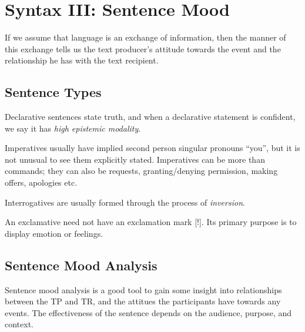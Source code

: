 \documentclass[../main.tex]{subfiles}
\begin{document}
	\section{Syntax III: Sentence Mood}
	\begin{preamb}
		If we assume that language is an exchange of information, then the manner of this exchange tells us the text producer's attitude towards the event and the relationship he has with the text recipient.
	\end{preamb}
	
	\subsection{Sentence Types}
		Declarative sentences state truth, and when a declarative statement is confident, we say it has \textit{high epistemic modality}.

		Imperatives usually have implied second person singular pronouns ``you'', but it is not unusual to see them explicitly stated.
		Imperatives can be more than commands; they can also be requests, granting/denying permission, making offers, apologies etc. 

		Interrogatives are usually formed through the process of \textit{inversion}.

		An exclamative need not have an exclamation mark [!]. Its primary purpose is to display emotion or feelings.

	\subsection{Sentence Mood Analysis}
	Sentence mood analysis is a good tool to gain some insight into relationships between the TP and TR, and the attitues the participants have towards any events. The effectiveness of the sentence depends on the audience, purpose, and context.
	
\end{document}

